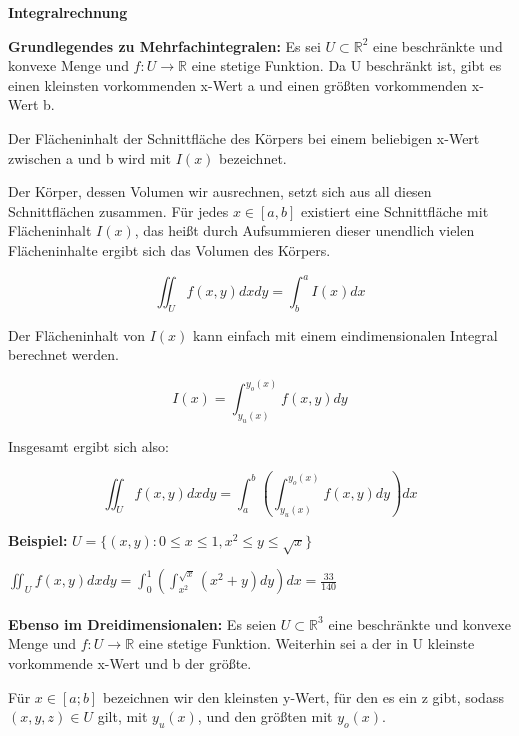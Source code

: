 \documentclass[fontset=ubuntu,12pt,a4paper,fleqn]{article}
\begin{document}
{\Large\textbf{Integralrechnung}\par}
\begin{multicols}{2}
\textbf{Grundlegendes zu Mehrfachintegralen:} Es sei \(U\subset\mathbb{R}^2\) eine beschränkte und konvexe Menge und \(f:U\to\mathbb{R}\) eine stetige Funktion. Da U beschränkt ist, gibt es einen kleinsten vorkommenden x-Wert a und einen größten vorkommenden x-Wert b.

Der Flächeninhalt der Schnittfläche des Körpers bei einem beliebigen x-Wert zwischen a und b wird mit \(I(x)\) bezeichnet.

Der Körper, dessen Volumen wir ausrechnen, setzt sich aus all diesen Schnittflächen zusammen. Für jedes \(x\in [a,b]\) existiert eine Schnittfläche mit Flächeninhalt \(I(x)\), das heißt durch Aufsummieren dieser unendlich vielen Flächeninhalte ergibt sich das Volumen des Körpers.

\[\iint_U f(x,y)dxdy = \int^a_b I(x)dx\]

Der Flächeninhalt von \(I(x)\) kann einfach mit einem eindimensionalen Integral berechnet werden.

\[I(x) = \int^{y_o(x)}_{y_u(x)} f(x,y)dy \]

Insgesamt ergibt sich also:

\[\iint_U f(x,y)dxdy = \int^b_a \left(\int^{y_o(x)}_{y_u(x)} f(x,y)dy\right)dx\]
\end{multicols}

\textbf{Beispiel:} \(U=\{(x,y):0 \leq x \leq 1, x^2 \leq y \leq \sqrt{x}\}\)



\(\iint_U f(x,y)dxdy=\int_0^1 \left(\int_{x^2}^{\sqrt{x}} (x^2+y) dy\right)dx = \frac{33}{140}\)
\\\\
\textbf{Ebenso im Dreidimensionalen: }
Es seien \(U\subset\mathbb{R}^3\) eine beschränkte und konvexe Menge und \(f:U\to\mathbb{R}\) eine stetige Funktion. Weiterhin sei a der in U kleinste vorkommende x-Wert und b der größte.

Für \(x\in[a;b]\) bezeichnen wir den kleinsten y-Wert, für den es ein z gibt, sodass \((x,y,z)\in U\) gilt, mit \(y_u(x)\), und den größten mit \(y_o(x)\).
\end{document}
